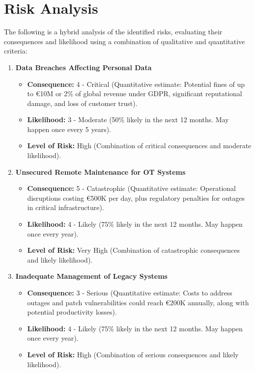 \section{Risk Analysis}

The following is a hybrid analysis of the identified risks, evaluating their consequences and likelihood using a combination of qualitative and quantitative criteria:

\begin{enumerate}
    \item \textbf{Data Breaches Affecting Personal Data}
    \begin{itemize}
        \item \textbf{Consequence:} 4 - Critical (Quantitative estimate: Potential fines of up to €10M or 2\% of global revenue under GDPR, significant reputational damage, and loss of customer trust).
        \item \textbf{Likelihood:} 3 - Moderate (50\% likely in the next 12 months. May happen once every 5 years).
        \item \textbf{Level of Risk:} High (Combination of critical consequences and moderate likelihood).
    \end{itemize}

    \item \textbf{Unsecured Remote Maintenance for OT Systems}
    \begin{itemize}
        \item \textbf{Consequence:} 5 - Catastrophic (Quantitative estimate: Operational disruptions costing €500K per day, plus regulatory penalties for outages in critical infrastructure).
        \item \textbf{Likelihood:} 4 - Likely (75\% likely in the next 12 months. May happen once every year).
        \item \textbf{Level of Risk:} Very High (Combination of catastrophic consequences and likely likelihood).
    \end{itemize}

    \item \textbf{Inadequate Management of Legacy Systems}
    \begin{itemize}
        \item \textbf{Consequence:} 3 - Serious (Quantitative estimate: Costs to address outages and patch vulnerabilities could reach €200K annually, along with potential productivity losses).
        \item \textbf{Likelihood:} 4 - Likely (75\% likely in the next 12 months. May happen once every year).
        \item \textbf{Level of Risk:} High (Combination of serious consequences and likely likelihood).
    \end{itemize}


\end{enumerate}
